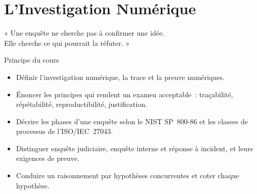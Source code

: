 
\chapter{L'Investigation Numérique}
\label{chap:investigation}

\epigraph{%
    « Une enquête ne cherche pas à confirmer une idée.\\
    Elle cherche ce qui pourrait la réfuter. »%
}{Principe du cours}


\begin{boxobjectifs}
\begin{itemize}
    \item Définir l'investigation numérique, la trace et la preuve
          numériques.
    \item Énoncer les principes qui rendent un examen acceptable~:
          traçabilité, répétabilité, reproductibilité, justification.
    \item Décrire les phases d'une enquête selon le NIST SP~800-86 et les
          classes de processus de l'ISO/IEC~27043.
    \item Distinguer enquête judiciaire, enquête interne et réponse à
          incident, et leurs exigences de preuve.
    \item Conduire un raisonnement par hypothèses concurrentes et coter
          chaque hypothèse.
\end{itemize}
\end{boxobjectifs}

\bigskip

